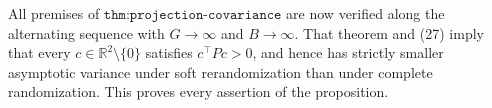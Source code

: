 All premises of \(\texttt{thm:projection-covariance}\) are now verified along the alternating sequence with \(G\to\infty\) and \(B\to\infty\).  That theorem and (27) imply that every \(c\in\mathbb R^2\setminus\{0\}\) satisfies \(c^\top Pc>0\), and hence has strictly smaller asymptotic variance under soft rerandomization than under complete randomization.  This proves every assertion of the proposition.